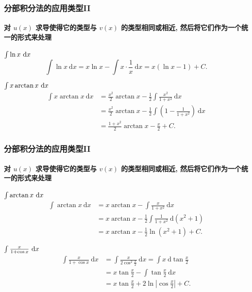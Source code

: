 \documentclass[
10pt,
aspectratio=43,
]{beamer}
\begin{document}
\begin{frame}
	\frametitle{分部积分法的应用类型II}
	\framesubtitle{对 $u(x)$ 求导使得它的类型与 $v(x)$ 的类型相同或相近, 然后将它们作为一个统一的形式来处理}
	\everymath{\displaystyle}
	\begin{exampleblock}{$\color{black}\int \ln x \mathrm{~d} x$}
		$$
			\int \ln x \mathrm{~d} x=x \ln x-\int x \cdot \frac{1}{x} \mathrm{~d} x=x(\ln x-1)+C.
		$$
	\end{exampleblock}
	\begin{exampleblock}{$\color{black}\int x \arctan x \mathrm{~d} x$}
		$$
			\begin{aligned}
				\int x \arctan x \mathrm{~d} x & =\frac{x^2}{2} \arctan x-\frac{1}{2} \int \frac{x^2}{1+x^2} \mathrm{~d} x             \\
				                               & =\frac{x^2}{2} \arctan x-\frac{1}{2} \int\left(1-\frac{1}{1+x^2}\right) \mathrm{~d} x \\
				                               & =\frac{1+x^2}{2} \arctan x-\frac{x}{2}+C.
			\end{aligned}
		$$
	\end{exampleblock}
\end{frame}

\begin{frame}
	\frametitle{分部积分法的应用类型II}
	\framesubtitle{对 $u(x)$ 求导使得它的类型与 $v(x)$ 的类型相同或相近, 然后将它们作为一个统一的形式来处理}
	\everymath{\displaystyle}
	{\small
		\begin{exampleblock}{$\color{black}\int  \arctan x \mathrm{~d} x$}
			$$
				\begin{aligned}
					\int  \arctan x \mathrm{~d} x & =x \arctan x- \int \frac{x}{1+x^2} \mathrm{~d} x                  \\
					                              & = x \arctan x-\frac{1}{2} \int\frac{1}{1+x^2} \mathrm{~d} (x^2+1) \\
					                              & = x \arctan x-\frac{1}{2}\ln\left(x^2+1\right)+C.
				\end{aligned}
			$$
		\end{exampleblock}
		\begin{exampleblock}{$\color{black}\int \frac{x}{1+\cos x} \mathrm{~d} x$}
			$$
				\begin{aligned}
					\int \frac{x}{1+\cos x} \mathrm{~d} x & =\int \frac{x}{2 \cos ^2 \frac{x}{2}} \mathrm{~d} x=\int x \mathrm{~d} \tan \frac{x}{2} \\
					                                      & =x \tan \frac{x}{2}-\int \tan \frac{x}{2} \mathrm{~d} x                                 \\
					                                      & =x \tan \frac{x}{2}+2 \ln \left|\cos \frac{x}{2}\right|+C.
				\end{aligned}
			$$
		\end{exampleblock}
	}
\end{frame}
\end{document}
